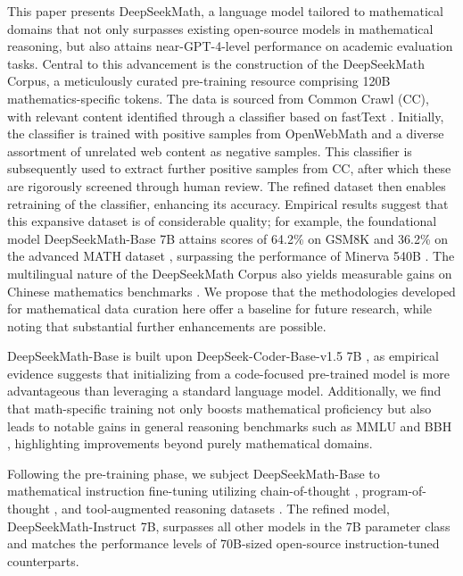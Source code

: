 This paper presents DeepSeekMath, a language model tailored to mathematical domains that not only surpasses existing open-source models in mathematical reasoning, but also attains near-GPT-4-level performance on academic evaluation tasks. Central to this advancement is the construction of the DeepSeekMath Corpus, a meticulously curated pre-training resource comprising 120B mathematics-specific tokens. The data is sourced from Common Crawl (CC), with relevant content identified through a classifier based on fastText \citep{joulin2016fasttext}. Initially, the classifier is trained with positive samples from OpenWebMath \citep{openwebmath} and a diverse assortment of unrelated web content as negative samples. This classifier is subsequently used to extract further positive samples from CC, after which these are rigorously screened through human review. The refined dataset then enables retraining of the classifier, enhancing its accuracy. Empirical results suggest that this expansive dataset is of considerable quality; for example, the foundational model DeepSeekMath-Base 7B attains scores of 64.2\% on GSM8K \citep{gsm8k} and 36.2\% on the advanced MATH dataset \citep{MATH}, surpassing the performance of Minerva 540B \citep{minerva}. The multilingual nature of the DeepSeekMath Corpus also yields measurable gains on Chinese mathematics benchmarks \citep{wei2023cmath,agieval}. We propose that the methodologies developed for mathematical data curation here offer a baseline for future research, while noting that substantial further enhancements are possible.

DeepSeekMath-Base is built upon DeepSeek-Coder-Base-v1.5 7B \citep{deepseek-coder}, as empirical evidence suggests that initializing from a code-focused pre-trained model is more advantageous than leveraging a standard language model. Additionally, we find that math-specific training not only boosts mathematical proficiency but also leads to notable gains in general reasoning benchmarks such as MMLU \citep{mmlu} and BBH \citep{bbh}, highlighting improvements beyond purely mathematical domains.

Following the pre-training phase, we subject DeepSeekMath-Base to mathematical instruction fine-tuning utilizing chain-of-thought \citep{cot}, program-of-thought \citep{pot,pal}, and tool-augmented reasoning datasets \citep{tora}. The refined model, DeepSeekMath-Instruct 7B, surpasses all other models in the 7B parameter class and matches the performance levels of 70B-sized open-source instruction-tuned counterparts.

